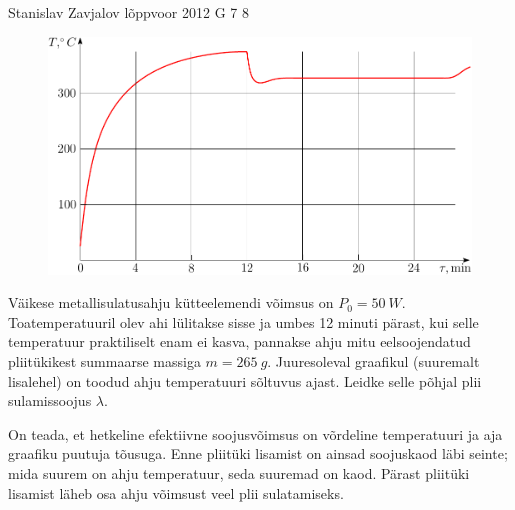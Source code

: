 {Stanislav Zavjalov} %
{lõppvoor} %
{2012} %
{G 7} %
{8} %
{
\ifStatement
\begin{figure}%
\includegraphics[width=\linewidth]{2012-v3g-07-ahi_graafik}%
\end{figure}
Väikese metallisulatusahju kütteelemendi võimsus on $P_0 = \SI{50}{W}$.
Toatemperatuuril olev ahi lülitakse sisse ja umbes 12 minuti pärast,
kui selle temperatuur praktiliselt enam ei kasva, pannakse ahju mitu
eelsoojendatud pliitükikest summaarse massiga $m = \SI{265}{g}$. Juuresoleval graafikul (suuremalt
lisalehel) on toodud
ahju temperatuuri sõltuvus ajast. Leidke selle põhjal plii sulamissoojus
$\lambda$.
\fi


\ifHint
On teada, et hetkeline efektiivne soojusvõimsus on võrdeline temperatuuri ja aja graafiku puutuja tõusuga. Enne pliitüki lisamist on ainsad soojuskaod läbi seinte; mida suurem on ahju temperatuur, seda suuremad on kaod. Pärast pliitüki lisamist läheb osa ahju võimsust veel plii sulatamiseks.
\fi


}
